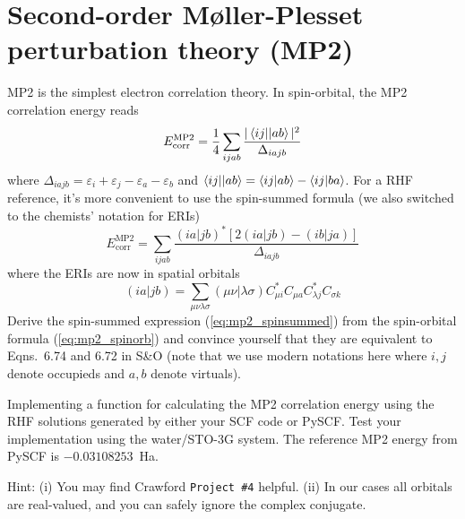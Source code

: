\documentclass[parskip=full]{article}
\begin{document}
    \section{Second-order M{\o}ller-Plesset perturbation theory (MP2)}

    MP2 is the simplest electron correlation theory.
    In spin-orbital, the MP2 correlation energy reads
    \begin{equation}    \label{eq:mp2_spinorb}
        E_{\textrm{corr}}^{\textrm{MP2}}
            = \frac{1}{4} \sum_{ijab} \frac{|\braket{ij||ab}|^2}{\Delta_{iajb}}
    \end{equation}
    where $\Delta_{iajb} = \varepsilon_i + \varepsilon_j - \varepsilon_a - \varepsilon_b$ and $\braket{ij||ab} = \braket{ij|ab} - \braket{ij|ba}$.
    For a RHF reference, it's more convenient to use the spin-summed formula (we also switched to the chemists' notation for ERIs)
    \begin{equation}    \label{eq:mp2_spinsummed}
        E_{\textrm{corr}}^{\textrm{MP2}}
            = \sum_{ijab} \frac{(ia|jb)^* [2(ia|jb) - (ib|ja)]}{\Delta_{iajb}}
    \end{equation}
    where the ERIs are now in spatial orbitals
    \begin{equation}
        (ia|jb)
            = \sum_{\mu\nu\lambda\sigma} (\mu\nu|\lambda\sigma) C^*_{\mu i} C_{\mu a} C^*_{\lambda j} C_{\sigma k}
    \end{equation}
    Derive the spin-summed expression (\ref{eq:mp2_spinsummed}) from the spin-orbital formula (\ref{eq:mp2_spinorb}) and convince yourself that they are equivalent to Eqns.~6.74 and 6.72 in S\&O (note that we use modern notations here where $i,j$ denote occupieds and $a,b$ denote virtuals).

    Implementing a function for calculating the MP2 correlation energy using the RHF solutions generated by either your SCF code or PySCF.
    Test your implementation using the water/STO-3G system.
    The reference MP2 energy from PySCF is $-0.03108253$~Ha.

    Hint: (i) You may find Crawford \texttt{Project \#4} helpful.
    (ii) In our cases all orbitals are real-valued, and you can safely ignore the complex conjugate.





\end{document}
